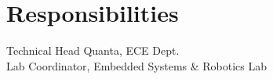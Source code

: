 \documentclass[]{deedy-resume-openfont}
\begin{document}
\begin{minipage}[t]{0.33\textwidth}
\section{Responsibilities}
\textbullet{} Technical Head Quanta, ECE Dept. \\
\textbullet{} Lab Coordinator, Embedded Systems \& Robotics Lab
\sectionsep


%
%

\end{minipage} 
\hfill
\end{document}
